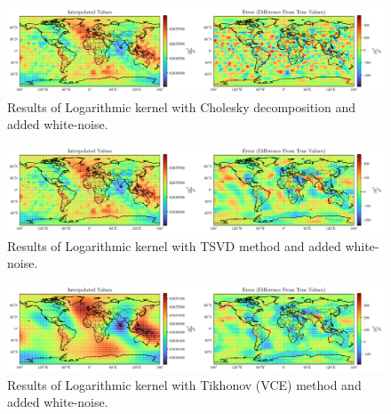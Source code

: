 \documentclass[12pt]{article}
\begin{document}
	\begin{figure}[h!]
		\centering
		\includegraphics[width=16cm]{../Outputs/Logarithmic_Cholesky_Noise.pdf}
		\caption{Results of Logarithmic kernel with Cholesky decomposition and added white-noise.}
		\label{fig:Logarithmic_Chol_Noise}
	\end{figure}
	
	\clearpage
	
	\begin{figure}[h!]
		\centering
		\includegraphics[width=16cm]{../Outputs/Logarithmic_TSVD_Noise.pdf}
		\caption{Results of Logarithmic kernel with TSVD method and added white-noise.}
		\label{fig:Logarithmic_TSVD_Noise}
	\end{figure}
	
	\begin{figure}[h!]
		\centering
		\includegraphics[width=16cm]{../Outputs/Logarithmic_VCE_Noise.pdf}
		\caption{Results of Logarithmic kernel with Tikhonov (VCE) method and added white-noise.}
		\label{fig:Logarithmic_VCE_Noise}
	\end{figure}
	
\end{document}
